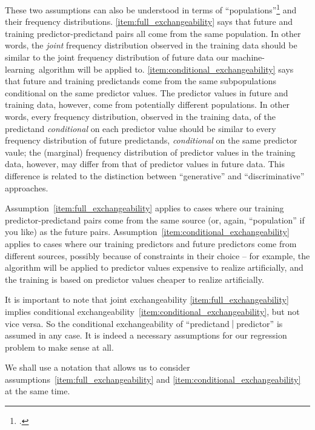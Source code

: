 \documentclass[\ifafour a4paper,12pt,\else a5paper,10pt,\fi%
onecolumn,oneside,article,%
british%
]{memoir}
\theoremstyle{remark}
\theoremstyle{innote}
\newcommand*{\citep}{\footcites}
\renewcommand*{\|}[1][]{\nonscript\:#1\vert\nonscript\:\mathopen{}}
\newcommand*{\ml}{machine-learning}
\begin{document}
These two assumptions can also be understood in terms of
\enquote{populations}\citep[see the extremely insightful discussion
in][]{lindleyetal1981} and their frequency distributions.
\ref{item:full_exchangeability} says that future and training
predictor-predictand pairs all come from the same population. In other
words, the \emph{joint} frequency distribution observed in the training
data should be similar to the joint frequency distribution of future data
our \ml\ algorithm will be applied to.
\ref{item:conditional_exchangeability} says that future and training
predictands come from the same subpopulations conditional on the same
predictor values. The predictor values in future and training data,
however, come from potentially different populations. In other words, every
frequency distribution, observed in the training data, of the predictand
\emph{conditional} on each predictor value should be similar to every
frequency distribution of future predictands, \emph{conditional} on the
same predictor vaule; the (marginal) frequency distribution of predictor
values in the training data, however, may differ from that of predictor
values in future data. This difference is related to the distinction
between \enquote{generative} and \enquote{discriminative} approaches.

Assumption~\ref{item:full_exchangeability} applies to cases where our
training predictor-predictand pairs come from the same source (or, again,
\enquote{population} if you like) as the future pairs.
Assumption~\ref{item:conditional_exchangeability} applies to cases where
our training predictors and future predictors come from different sources,
possibly because of constraints in their choice -- for example, the
algorithm will be applied to predictor values expensive to realize
artificially, and the training is based on predictor values cheaper to
realize artificially.

It is important to note that joint exchangeability
\ref{item:full_exchangeability} implies conditional
exchangeability~\ref{item:conditional_exchangeability}, but not vice versa.
So the conditional exchangeability of \enquote{predictand${}\|{}$predictor}
is assumed in any case. It is indeed a necessary assumptions for our
regression problem to make sense at all.

We shall use a notation that allows us to consider
assumptions~\ref{item:full_exchangeability} and
\ref{item:conditional_exchangeability} at the same time.
\end{document}
